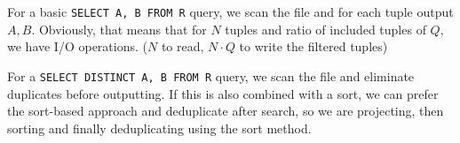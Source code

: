 For a basic \texttt{SELECT A, B FROM R} query, we scan the file and for each tuple output $A, B$.
Obviously, that means that for $N$ tuples and ratio of included tuples of $Q$, we have  I/O operations.
($N$ to read, $N \cdot Q$ to write the filtered tuples)

For a \texttt{SELECT DISTINCT A, B FROM R} query, we scan the file and eliminate duplicates before outputting.
If this is also combined with a sort, we can prefer the sort-based approach and deduplicate after search,
so we are projecting, then sorting and finally deduplicating using the sort method.
